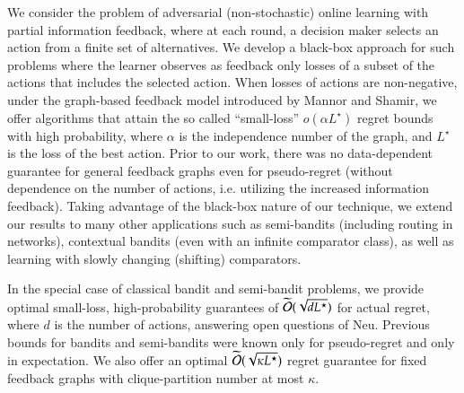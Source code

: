 We consider the problem of adversarial (non-stochastic) online learning with partial information feedback, where at each round, a decision maker selects an action from a finite set of alternatives. We develop a black-box approach for such problems where the learner observes as feedback only losses of a subset of the actions that includes the selected action. When losses of actions are non-negative, under the graph-based feedback model introduced by Mannor and Shamir, we offer algorithms that attain the so called ``small-loss'' $o(\alpha L^{\star})$ regret bounds with high probability, where $\alpha$ is the independence number of the graph, and $L^{\star}$ is the loss of the best action. Prior to our work, there was no data-dependent guarantee for general feedback graphs even for pseudo-regret (without dependence on the number of actions, i.e. utilizing the increased information feedback). Taking advantage of the black-box nature of our technique, we extend our results to many other applications such as semi-bandits (including routing in networks), contextual bandits (even with an infinite comparator class), as well as learning with slowly changing (shifting) comparators.

In the special case of classical bandit and semi-bandit problems, we provide optimal small-loss,  high-probability guarantees of $\widetilde{\mathcal{O}}(\sqrt{dL^{\star}})$ for actual regret, where $d$ is the number of actions, answering open questions of Neu.  Previous bounds for bandits and semi-bandits were known only for pseudo-regret and only in expectation. We also offer an optimal $\widetilde{\mathcal{O}}(\sqrt{\kappa L^{\star}})$ regret guarantee for fixed feedback graphs with clique-partition number at most $\kappa$.